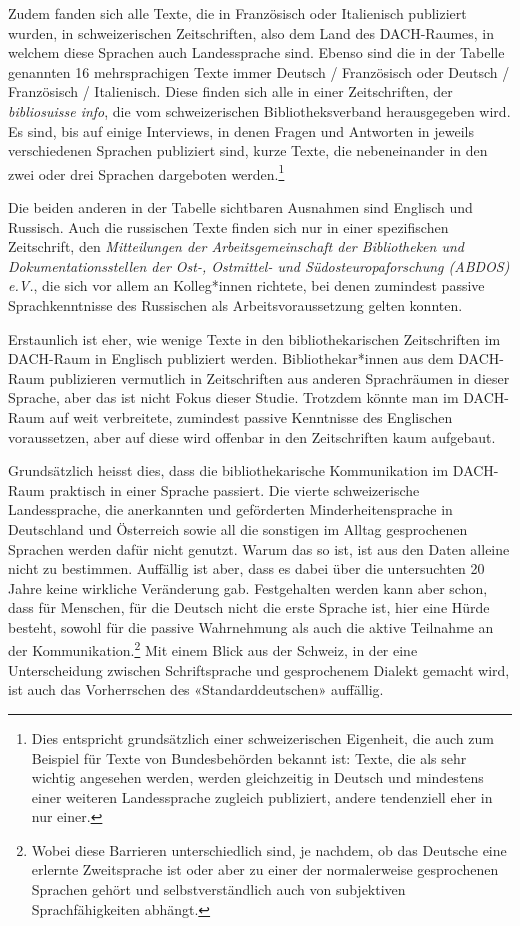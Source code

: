 \documentclass[a4paper,
fontsize=11pt,
oneside,
numbers=noperiodatend,
parskip=half-,
bibliography=totoc,
final
]{scrartcl}
\begin{document}
Zudem fanden sich alle Texte, die in Französisch oder Italienisch
publiziert wurden, in schweizerischen Zeitschriften, also dem Land des
DACH-Raumes, in welchem diese Sprachen auch Landessprache sind. Ebenso
sind die in der Tabelle genannten 16 mehrsprachigen Texte immer Deutsch
/ Französisch oder Deutsch / Französisch / Italienisch. Diese finden
sich alle in einer Zeitschriften, der \emph{bibliosuisse info}, die vom
schweizerischen Bibliotheksverband herausgegeben wird. Es sind, bis auf
einige Interviews, in denen Fragen und Antworten in jeweils
verschiedenen Sprachen publiziert sind, kurze Texte, die nebeneinander
in den zwei oder drei Sprachen dargeboten werden.\footnote{Dies
  entspricht grundsätzlich einer schweizerischen Eigenheit, die auch zum
  Beispiel für Texte von Bundesbehörden bekannt ist: Texte, die als sehr
  wichtig angesehen werden, werden gleichzeitig in Deutsch und
  mindestens einer weiteren Landessprache zugleich publiziert, andere
  tendenziell eher in nur einer.}

Die beiden anderen in der Tabelle sichtbaren Ausnahmen sind Englisch und
Russisch. Auch die russischen Texte finden sich nur in einer
spezifischen Zeitschrift, den \emph{Mitteilungen der Arbeitsgemeinschaft
der Bibliotheken und Dokumentationsstellen der Ost-, Ostmittel- und
Südosteuropaforschung (ABDOS) e.V.}, die sich vor allem an Kolleg*innen
richtete, bei denen zumindest passive Sprachkenntnisse des Russischen
als Arbeitsvoraussetzung gelten konnten.

Erstaunlich ist eher, wie wenige Texte in den bibliothekarischen
Zeitschriften im DACH-Raum in Englisch publiziert werden.
Bibliothekar*innen aus dem DACH-Raum publizieren vermutlich in
Zeitschriften aus anderen Sprachräumen in dieser Sprache, aber das ist
nicht Fokus dieser Studie. Trotzdem könnte man im DACH-Raum auf weit
verbreitete, zumindest passive Kenntnisse des Englischen voraussetzen,
aber auf diese wird offenbar in den Zeitschriften kaum aufgebaut.

Grundsätzlich heisst dies, dass die bibliothekarische Kommunikation im
DACH-Raum praktisch in einer Sprache passiert. Die vierte schweizerische
Landessprache, die anerkannten und geförderten Minderheitensprache in
Deutschland und Österreich sowie all die sonstigen im Alltag
gesprochenen Sprachen werden dafür nicht genutzt. Warum das so ist, ist
aus den Daten alleine nicht zu bestimmen. Auffällig ist aber, dass es
dabei über die untersuchten 20 Jahre keine wirkliche Veränderung gab.
Festgehalten werden kann aber schon, dass für Menschen, für die Deutsch
nicht die erste Sprache ist, hier eine Hürde besteht, sowohl für die
passive Wahrnehmung als auch die aktive Teilnahme an der
Kommunikation.\footnote{Wobei diese Barrieren unterschiedlich sind, je
  nachdem, ob das Deutsche eine erlernte Zweitsprache ist oder aber zu
  einer der normalerweise gesprochenen Sprachen gehört und
  selbstverständlich auch von subjektiven Sprachfähigkeiten abhängt.}
Mit einem Blick aus der Schweiz, in der eine Unterscheidung zwischen
Schriftsprache und gesprochenem Dialekt gemacht wird, ist auch das
Vorherrschen des «Standarddeutschen» auffällig.
\end{document}
